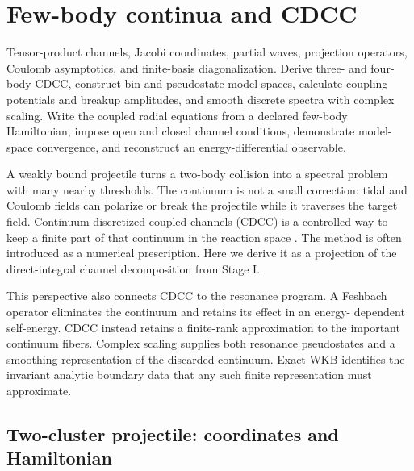 \section{Few-body continua and CDCC}
\label{sec:few-body-cdcc}

\calculationroute
  {Tensor-product channels, Jacobi coordinates, partial waves, projection
  operators, Coulomb asymptotics, and finite-basis diagonalization.}
  {Derive three- and four-body CDCC, construct bin and pseudostate model
  spaces, calculate coupling potentials and breakup amplitudes, and smooth
  discrete spectra with complex scaling.}
  {Write the coupled radial equations from a declared few-body Hamiltonian,
  impose open and closed channel conditions, demonstrate model-space
  convergence, and reconstruct an energy-differential observable.}

A weakly bound projectile turns a two-body collision into a spectral problem
with many nearby thresholds.  The continuum is not a small correction: tidal
and Coulomb fields can polarize or break the projectile while it traverses the
target field.  Continuum-discretized coupled channels (CDCC) is a controlled
way to keep a finite part of that continuum in the reaction space
\cite{Kamimura1986CDCC,Austern1987CDCC,Yahiro2012CDCC}.  The method is often
introduced as a numerical prescription.  Here we derive it as a projection of
the direct-integral channel decomposition from Stage I.

This perspective also connects CDCC to the resonance program.  A Feshbach
operator eliminates the continuum and retains its effect in an energy-
dependent self-energy.  CDCC instead retains a finite-rank approximation to
the important continuum fibers.  Complex scaling supplies both resonance
pseudostates and a smoothing representation of the discarded continuum.
Exact WKB identifies the invariant analytic boundary data that any such finite
representation must approximate.

\subsection{Two-cluster projectile: coordinates and Hamiltonian}
\label{subsec:two-cluster-projectile}

